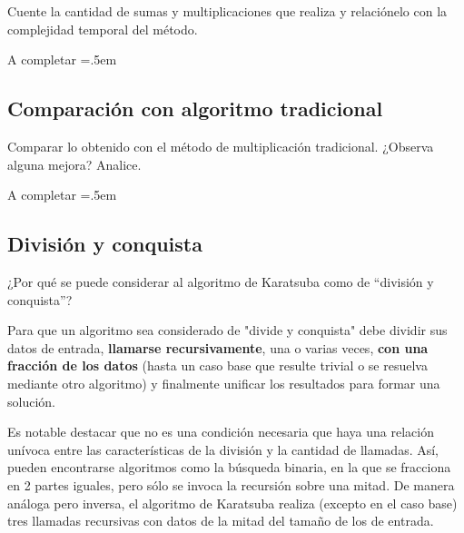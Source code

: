 \documentclass[titlepage,a4paper]{article}
\newenvironment{lcverbatim}
 {\SaveVerbatim{cverb}}
 {\endSaveVerbatim
  \flushleft\fboxrule=0pt\fboxsep=.5em
  \colorbox{cverbbg}{%
    \makebox[\dimexpr\linewidth-2\fboxsep][l]{\BUseVerbatim{cverb}}%
  }
  \endflushleft
}
\begin{document}
\begin{tcolorbox}[colback=blue!5!white,colframe=blue!75!black,title=Enunciado 1.2]
    Cuente la cantidad de sumas y multiplicaciones que realiza y relaciónelo con la complejidad temporal del método.
\end{tcolorbox}

\begin{lcverbatim}
    A completar
\end{lcverbatim}


\subsection{Comparación con algoritmo tradicional}
\begin{tcolorbox}[colback=blue!5!white,colframe=blue!75!black,title=Enunciado 1.3]
    Comparar lo obtenido con el método de multiplicación tradicional. ¿Observa alguna mejora? Analice.
\end{tcolorbox}

\begin{lcverbatim}
    A completar
\end{lcverbatim}


\subsection{División y conquista}

\begin{tcolorbox}[colback=blue!5!white,colframe=blue!75!black,title=Enunciado 1.4]
    ¿Por qué se puede considerar al algoritmo de Karatsuba como de “división y conquista”?
\end{tcolorbox}

Para que un algoritmo sea considerado de "divide y conquista" debe dividir sus datos de entrada, \textbf{llamarse recursivamente}, una o varias veces, \textbf{con una fracción de los datos} (hasta un caso base que resulte trivial o se resuelva mediante otro algoritmo) y finalmente unificar los resultados para formar una solución.

Es notable destacar que no es una condición necesaria que haya una relación unívoca entre las características de la división y la cantidad de llamadas. Así, pueden encontrarse algoritmos como la búsqueda binaria, en la que se fracciona en 2 partes iguales, pero sólo se invoca la recursión sobre una mitad. De manera análoga pero inversa, el algoritmo de Karatsuba realiza (excepto en el caso base) tres llamadas recursivas con datos de la mitad del tamaño de los de entrada.
\end{document}
